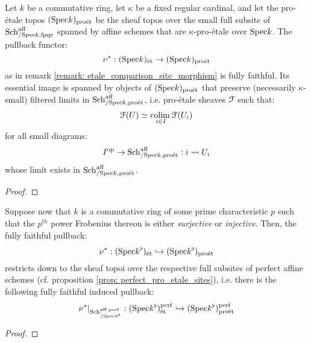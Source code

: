                     \begin{proposition} \label{prop: etale_topoi_coreflect_pro_etale_topoi}
                        Let $k$ be a commutative ring, let $\kappa$ be a fixed regular cardinal, and let the pro-\'etale topos $(\mathrm{Spec} k)_{\mathrm{pro\acute{e}t}}$ be the sheaf topos over the small full subsite of $\mathrm{Sch}^{\mathrm{aff}}_{/\mathrm{Spec} k, \mathrm{fpqc}}$ spanned by affine schemes that are $\kappa$-pro-\'etale over $\mathrm{Spec} k$. The pullback functor:
                            $$\nu^*: (\mathrm{Spec} k)_{\mathrm{\acute{e}t}} \to (\mathrm{Spec} k)_{\mathrm{pro\acute{e}t}}$$
                        as in remark \ref{remark: etale_comparison_site_morphism} is fully faithful. Its essential image is spanned by objects of $(\mathrm{Spec} k)_{\mathrm{pro\acute{e}t}}$ that preserve (necessarily $\kappa$-small) filtered limits in $\mathrm{Sch}^{\mathrm{aff}}_{/\mathrm{Spec} k, \mathrm{pro\acute{e}t}}$, i.e. pro-\'etale sheaves $\mathcal{F}$ such that:
                            $$\mathcal{F}(U) \simeq \underset{i \in I}{\operatorname{colim} \:} \mathcal{F}(U_i)$$
                        for all small diagrams:
                            $$I^{\mathrm{op}} \to \mathrm{Sch}^{\mathrm{aff}}_{/\mathrm{Spec} k, \mathrm{pro\acute{e}t}}: i \leadsto U_i$$
                        whose limit exists in $\mathrm{Sch}^{\mathrm{aff}}_{/\mathrm{Spec} k, \mathrm{pro\acute{e}t}}$. 
                    \end{proposition}
                        \begin{proof}
                            
                        \end{proof}
                    \begin{corollary}
                        Suppose now that $k$ is a commutative ring of some prime characteristic $p$ such that the $p^{th}$ power Frobenius thereon is either \textit{surjective} or \textit{injective}. Then, the fully faithful pullback:
                            $$\nu^*: (\mathrm{Spec} k^{\flat})_{\mathrm{\acute{e}t}} \hookrightarrow (\mathrm{Spec} k^{\flat})_{\mathrm{pro\acute{e}t}}$$
                        restricts down to the sheaf topoi over the respective full subsites of perfect affine schemes (cf. proposition \ref{prop: perfect_pro_etale_sites}), i.e. there is the following fully faithful induced pullback:
                            $$\nu^*|_{\mathrm{Sch}^{\mathrm{aff}, \mathrm{perf}}_{/\mathrm{Spec} k^{\flat}}}: (\mathrm{Spec} k^{\flat})^{\mathrm{perf}}_{\mathrm{\acute{e}t}} \hookrightarrow (\mathrm{Spec} k^{\flat})^{\mathrm{perf}}_{\mathrm{pro\acute{e}t}}$$
                    \end{corollary}
                        \begin{proof}
                            
                        \end{proof}
                    
